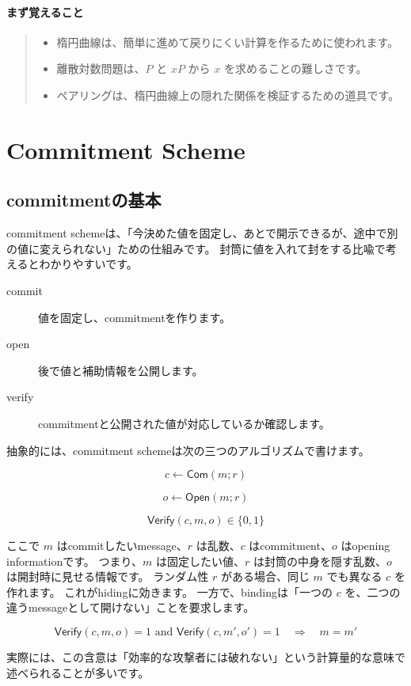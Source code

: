 \documentclass[a4paper,11pt]{ltjsarticle}
\newcommand{\Com}{\mathsf{Com}}
\newcommand{\Open}{\mathsf{Open}}
\newcommand{\Verify}{\mathsf{Verify}}
\newenvironment{keybox}{%
  \paragraph*{まず覚えること}\begin{quote}
}{%
  \end{quote}
}
\begin{document}
\begin{keybox}
\begin{itemize}
  \item 楕円曲線は、簡単に進めて戻りにくい計算を作るために使われます。
  \item 離散対数問題は、\(P\) と \(xP\) から \(x\) を求めることの難しさです。
  \item ペアリングは、楕円曲線上の隠れた関係を検証するための道具です。
\end{itemize}
\end{keybox}

\section{Commitment Scheme}

\subsection{commitmentの基本}

commitment schemeは、「今決めた値を固定し、あとで開示できるが、途中で別の値に変えられない」ための仕組みです。
封筒に値を入れて封をする比喩で考えるとわかりやすいです。

\begin{description}
  \item[commit] 値を固定し、commitmentを作ります。
  \item[open] 後で値と補助情報を公開します。
  \item[verify] commitmentと公開された値が対応しているか確認します。
\end{description}

抽象的には、commitment schemeは次の三つのアルゴリズムで書けます。

\[
  c \leftarrow \Com(m;r)
\]

\[
  o \leftarrow \Open(m;r)
\]

\[
  \Verify(c,m,o)\in\{0,1\}
\]

ここで \(m\) はcommitしたいmessage、\(r\) は乱数、\(c\) はcommitment、\(o\) はopening informationです。
つまり、\(m\) は固定したい値、\(r\) は封筒の中身を隠す乱数、\(o\) は開封時に見せる情報です。
ランダム性 \(r\) がある場合、同じ \(m\) でも異なる \(c\) を作れます。
これがhidingに効きます。
一方で、bindingは「一つの \(c\) を、二つの違うmessageとして開けない」ことを要求します。

\[
  \Verify(c,m,o)=1
  \text{ and }
  \Verify(c,m',o')=1
  \quad \Rightarrow \quad
  m=m'
\]

実際には、この含意は「効率的な攻撃者には破れない」という計算量的な意味で述べられることが多いです。
\end{document}
